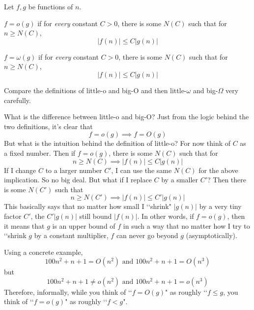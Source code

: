 \begin{defn}
  Let $f,g$ be functions of $n$.
  \begin{myenum}
  \item
    $f = o(g)$
    if for \textit{every} constant $C > 0$, there is some $N(C)$ such that
    for $n \geq N(C)$,
    \[
    |f(n)| \leq C |g(n)|
    \]
  \item
    $f = \omega(g)$\tinysidebar{$\omega$}
    if for \textit{every} constant $C > 0$, there is some $N(C)$ such that
    for $n \geq N(C)$,
    \[
    |f(n)| \leq C |g(n)|
    \]
  \end{myenum}
   Compare the definitions of little-o and big-O and then
   little-$\omega$ and big-$\Omega$ very carefully.
\end{defn}


What is the difference between little-o and big-O?
Just from the logic behind the two definitions, it's clear that
\[
f = o(g) \implies f = O(g)
\]
But what is the intuition behind the definition of little-o?
For now think of $C$ as a fixed number.
Then if $f = o(g)$, there is some $N(C)$ such that for
\[
n \geq N(C) \implies |f(n)| \leq C|g(n)|
\]
If I change $C$ to a larger number $C'$, I can use the same $N(C)$
for the above implication.
So no big deal.
But what if I replace $C$ by a smaller $C'$?
Then there is some $N(C')$ such that
\[
n \geq N(C') \implies |f(n)| \leq C'|g(n)|
\]
This basically says that no matter how small I \lq\lq shrink" $|g(n)|$
by a very tiny factor $C'$, the $C'|g(n)|$ still bound
$|f(n)|$.
In other words, if $f = o(g)$, then it means that
$g$ is an upper bound of $f$ in such a
way that no matter how I try to \lq\lq shrink $g$ by a constant
multiplier, $f$ can never go beyond $g$ (asymptotically).

Using a concrete example,
\[
100n^2 + n + 1 = O(n^2) \text{ and } 100n^2 + n + 1 = O(n^3)
\]
but
\[
100n^2 + n + 1 \neq o(n^2) \text{ and } 100n^2 + n + 1 = o(n^3)
\]
Therefore, informally, while you think of \lq\lq $f = O(g)$" as
roughly \lq\lq $f \leq g$, you think of \lq\lq $f = o(g)$"
as roughly \lq\lq $f < g$".

